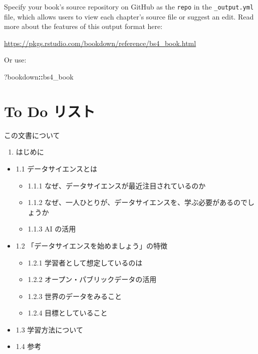 \documentclass[
  xelatex, ja=standard]{bxjsbook}
\newenvironment{Shaded}{\begin{snugshade}}{\end{snugshade}}
\newcommand{\NormalTok}[1]{#1}
\newcommand{\SpecialCharTok}[1]{\textcolor[rgb]{0.81,0.36,0.00}{\textbf{#1}}}
\providecommand{\tightlist}{%
  \setlength{\itemsep}{0pt}\setlength{\parskip}{0pt}}
\theoremstyle{definition}
\theoremstyle{definition}
\theoremstyle{definition}
\theoremstyle{definition}
\theoremstyle{remark}
\begin{document}
Specify your book's source repository on GitHub as the \texttt{repo} in the \texttt{\_output.yml} file, which allows users to view each chapter's source file or suggest an edit. Read more about the features of this output format here:

\url{https://pkgs.rstudio.com/bookdown/reference/bs4_book.html}

Or use:

\begin{Shaded}
\begin{Highlighting}[]
\NormalTok{?bookdown}\SpecialCharTok{::}\NormalTok{bs4\_book}
\end{Highlighting}
\end{Shaded}

\hypertarget{todo-list}{%
\chapter{To Do リスト}\label{todo-list}}

この文書について

\begin{enumerate}
\def\labelenumi{\arabic{enumi}.}
\tightlist
\item
  はじめに
\end{enumerate}

\begin{itemize}
\tightlist
\item
  1.1 データサイエンスとは

  \begin{itemize}
  \tightlist
  \item
    1.1.1 なぜ、データサイエンスが最近注目されているのか
  \item
    1.1.2 なぜ、一人ひとりが、データサイエンスを、学ぶ必要があるのでしょうか
  \item
    1.1.3 AI の活用
  \end{itemize}
\item
  1.2 「データサイエンスを始めましょう」の特徴

  \begin{itemize}
  \tightlist
  \item
    1.2.1 学習者として想定しているのは
  \item
    1.2.2 オープン・パブリックデータの活用
  \item
    1.2.3 世界のデータをみること
  \item
    1.2.4 目標としていること
  \end{itemize}
\item
  1.3 学習方法について
\item
  1.4 参考
\end{itemize}
\end{document}
